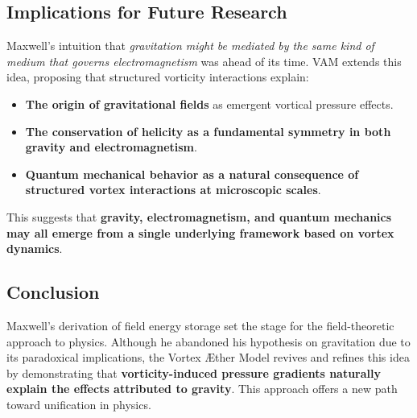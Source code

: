\begin{table}[h]
    \centering
    \caption{Comparison of Maxwell’s and VAM’s approach to gravitational energy storage.}
\end{table}

\subsection*{Implications for Future Research}
Maxwell’s intuition that \textit{gravitation might be mediated by the same kind of medium that governs electromagnetism} was ahead of its time. VAM extends this idea, proposing that structured vorticity interactions explain:
\begin{itemize}
    \item \textbf{The origin of gravitational fields} as emergent vortical pressure effects.
    \item \textbf{The conservation of helicity as a fundamental symmetry in both gravity and electromagnetism}.
    \item \textbf{Quantum mechanical behavior as a natural consequence of structured vortex interactions at microscopic scales}.
\end{itemize}
This suggests that \textbf{gravity, electromagnetism, and quantum mechanics may all emerge from a single underlying framework based on vortex dynamics}.

\subsection*{Conclusion}
Maxwell’s derivation of field energy storage set the stage for the field-theoretic approach to physics. Although he abandoned his hypothesis on gravitation due to its paradoxical implications, the Vortex Æther Model revives and refines this idea by demonstrating that \textbf{vorticity-induced pressure gradients naturally explain the effects attributed to gravity}. This approach offers a new path toward unification in physics.

